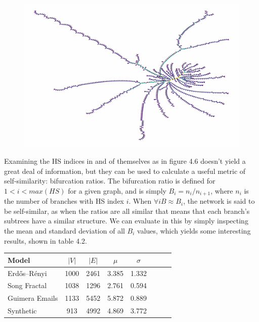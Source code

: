 \documentclass[12pt,twoside]{report}
\begin{document}
\begin{figure}[H]
\begin{center}
\begin{minipage}{0.45\linewidth}
\end{minipage}%
\hfill
\begin{minipage}{0.45\linewidth}
\includegraphics[width=\linewidth]{figures/1750_bifurcations.png}
\end{minipage}
\end{center}
\end{figure}

Examining the HS indices in and of themselves as in figure 4.6 doesn't yield a great deal of information, but they can be used to calculate a useful metric of self-similarity: bifurcation ratios. The bifurcation ratio is defined for $1 < i < max(HS)$ for a given graph, and is simply $B_i = n_i / n_{i+1}$, where $n_i$ is the number of branches with HS index $i$. When $\forall i B \approx B_i$, the network is said to be self-similar, as when the ratios are all similar that means that each branch's subtrees have a similar structure. We can evaluate in this by simply inspecting the mean and standard deviation of all $B_i$ values, which yields some interesting results, shown in table 4.2. \\

\begin{center}
\begin{tabular}{l*{6}{c}r}
Model              & $|V|$ & $|E|$ & $\mu$ & $\sigma$ \\
\hline
Erdős–Rényi    & 1000 & 2461 & 3.385 & 1.332  \\
Song Fractal   & 1038 & 1296 & 2.761 & 0.594  \\
Guimera Emails & 1133 & 5452 & 5.872 & 0.889  \\
Synthetic      & 913  & 4992 & 4.869 & 3.772  \\
\end{tabular}
\end{center}
\end{document}

